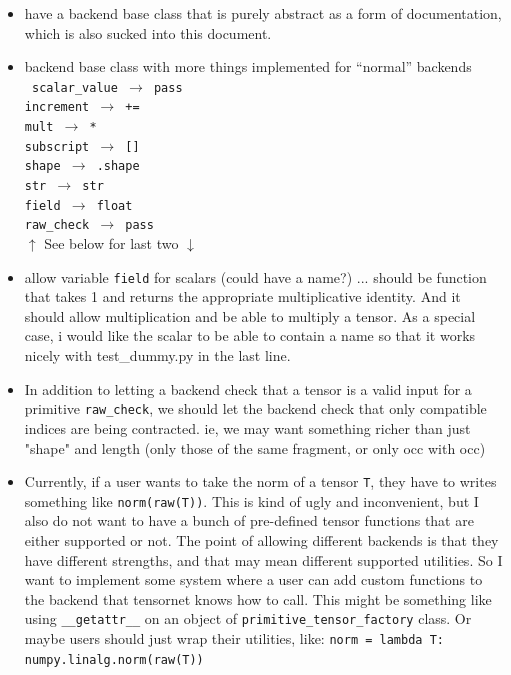 \documentclass[12pt,letterpaper]{article}
\begin{document}
\begin{itemize}
\item{
have a backend base class that is purely abstract as a form of documentation, which is also
sucked into this document.
}
\item{
backend base class with more things implemented for ``normal'' backends \\
\texttt{
scalar\_value $\rightarrow$ pass \\
increment $\rightarrow$  += \\
mult $\rightarrow$  * \\
subscript $\rightarrow$  [] \\
shape $\rightarrow$  .shape \\
str $\rightarrow$  str \\
field $\rightarrow$  float \\
raw\_check $\rightarrow$  pass \\
}
$\uparrow$ See below for last two $\downarrow$
}
\item{
allow variable \texttt{field} for scalars (could have a name?) ... should be function that takes
1 and returns the appropriate multiplicative identity.  And it should allow multiplication
and be able to multiply a tensor.  As a special case, i would like the scalar to be able to
contain a name so that it works nicely with test\_dummy.py in the last line.
}
\item{
In addition to letting a backend check that a tensor is a valid input for a primitive \texttt{raw\_check},
we should let the backend check that only compatible indices are being contracted.
ie, we may want something richer than just "shape" and length (only those of the same
fragment, or only occ with occ)
}
\item{
Currently, if a user wants to take the norm of a tensor \texttt{T},
 they have to writes something like \texttt{norm(raw(T))}.
This is kind of ugly and inconvenient, but I also do not want to have a bunch of pre-defined tensor
 functions that are either supported or not.  The point of allowing different backends is that they
 have different strengths, and that may mean different supported utilities.
So I want to implement some system where a user can add custom functions to the backend
 that tensornet knows how to call.  This might be something like using \texttt{\_\_getattr\_\_}
 on an object of \texttt{primitive\_tensor\_factory} class.
Or maybe users should just wrap their utilities, like:
\texttt{norm = lambda T: numpy.linalg.norm(raw(T))}
}
\end{itemize}
\end{document}
